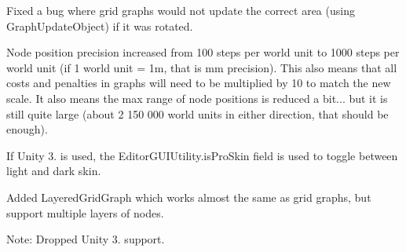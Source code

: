 \begin{DoxyItemize}
\begin{DoxyItemize}
\item Fixed a bug where grid graphs would not update the correct area (using Graph\+Update\+Object) if it was rotated.
\item Node position precision increased from 100 steps per world unit to 1000 steps per world unit (if 1 world unit = 1m, that is mm precision). This also means that all costs and penalties in graphs will need to be multiplied by 10 to match the new scale. It also means the max range of node positions is reduced a bit... but it is still quite large (about 2 150 000 world units in either direction, that should be enough).
\item If Unity 3. is used, the Editor\+G\+U\+I\+Utility.\+is\+Pro\+Skin field is used to toggle between light and dark skin.
\item Added Layered\+Grid\+Graph which works almost the same as grid graphs, but support multiple layers of nodes.
\item Note\+: Dropped Unity 3. support.


\end{DoxyItemize}
\end{DoxyItemize}
